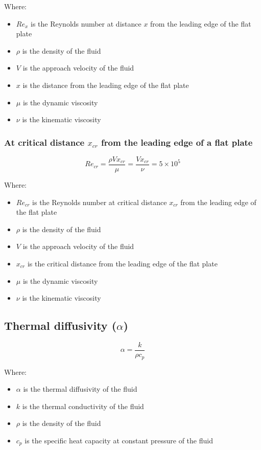\documentclass[11pt]{article}
\begin{document}
Where:
\begin{itemize}
\item \(Re_{x}\) is the Reynolds number at distance \(x\) from the leading edge of the flat plate
\item \(\rho\) is the density of the fluid
\item \(V\) is the approach velocity of the fluid
\item \(x\) is the distance from the leading edge of the flat plate
\item \(\mu\) is the dynamic viscosity
\item \(\nu\) is the kinematic viscosity
\end{itemize}

\subsubsection{At critical distance \(x_{cr}\) from the leading edge of a flat plate}
\label{sec:org0e43cf0}
\[Re_{cr} = \frac{\rho V x_{cr}}{\mu} = \frac{V x_{cr}}{\nu} = 5 \times 10^5\]

Where:
\begin{itemize}
\item \(Re_{cr}\) is the Reynolds number at critical distance \(x_{cr}\) from the leading edge of the flat plate
\item \(\rho\) is the density of the fluid
\item \(V\) is the approach velocity of the fluid
\item \(x_{cr}\) is the critical distance from the leading edge of the flat plate
\item \(\mu\) is the dynamic viscosity
\item \(\nu\) is the kinematic viscosity
\end{itemize}

 \newpage

\subsection{Thermal diffusivity (\(\alpha\))}
\label{sec:orgdd5d2f9}
\[\alpha = \frac{k}{\rho c_p}\]

Where:
\begin{itemize}
\item \(\alpha\) is the thermal diffusivity of the fluid
\item \(k\) is the thermal conductivity of the fluid
\item \(\rho\) is the density of the fluid
\item \(c_p\) is the specific heat capacity at constant pressure of the fluid
\end{itemize}
\end{document}
